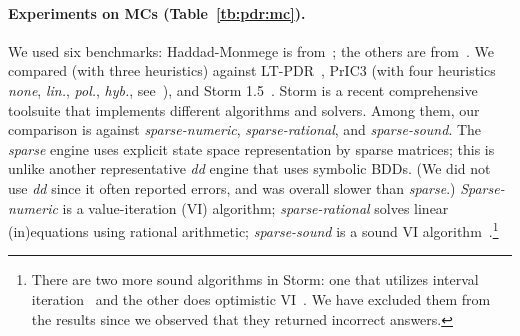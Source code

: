 \paragraph{Experiments on MCs (Table~\ref{tb:pdr:mc}).}
We used six benchmarks: Haddad\hyp{}Monmege is from~\cite{HKPQR19}; the others are from~\cite{BJKKMS20,KUKSH22}. We compared \ADPDR (with three heuristics) against LT-PDR~\cite{KUKSH22}, PrIC3 (with four  heuristics \emph{none}, \emph{lin.}, \emph{pol.}, \emph{hyb.}, see~\cite{BJKKMS20}), and Storm 1.5~\cite{DJKV17}. Storm is a recent comprehensive toolsuite that implements different algorithms and solvers. Among them, our comparison is against \emph{sparse-numeric}, \emph{sparse-rational}, and \emph{sparse-sound}.
The \emph{sparse} engine uses explicit state space representation by sparse matrices; this is unlike another representative \emph{dd} engine that uses symbolic BDDs. (We did not use \emph{dd} since it often reported errors, and was overall slower than \emph{sparse}.)
\emph{Sparse-numeric}  is a value-iteration (VI) algorithm;  \emph{sparse-rational}  solves linear (in)equations using rational arithmetic;
\emph{sparse-sound} is a sound VI algorithm~\cite{QK18}.\footnote{There are two more sound algorithms in Storm: one that utilizes interval iteration~\cite{BKLPW17} and the other does optimistic VI~\cite{HK20}. We have excluded them from the results since we observed that they returned incorrect answers.}

